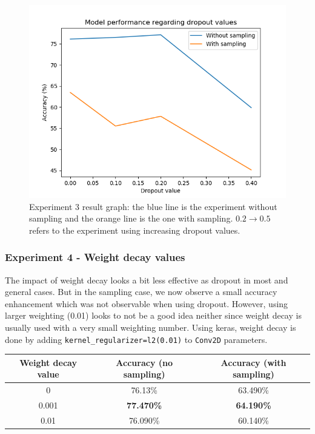 \documentclass[11pt, openany]{report}
\theoremstyle{plain}
\theoremstyle{definition}
\theoremstyle{remark}
\begin{document}
\begin{figure}[H]
  \centering
  \includegraphics[scale=0.6]{Code/ch5-ModelPrototype/figures_result/dropout_graph.png}
  \caption{Experiment 3 result graph: the blue line is the experiment without sampling and the orange line is the one with sampling. $0.2 \rightarrow 0.5$ refers to the experiment using increasing dropout values.}
  \label{fig:cifar_dropout_res}
\end{figure}

\subsubsection{Experiment 4 - Weight decay values} 

The impact of weight decay looks a bit less effective as dropout in most and general cases. But in the sampling case, we now observe a small accuracy enhancement which was not observable when using dropout. However, using larger weighting (0.01) looks to not be a good idea neither since weight decay is usually used with a very small weighting number. Using keras, weight decay is done by adding \texttt{kernel\_regularizer=l2(0.01)} to \texttt{Conv2D} parameters. 

\begin{center}
\begin{tabular}{|c|c|c|}
  \hline
  Weight decay value & Accuracy (no sampling) & Accuracy (with sampling) \\
  \hline
  0 & 76.13\% &  63.490\% \\
  0.001 & \textbf{77.470\%} & \textbf{64.190\%} \\
  0.01 & 76.090\% & 60.140\% \\
  \hline
\end{tabular}
\end{center}
\end{document}
